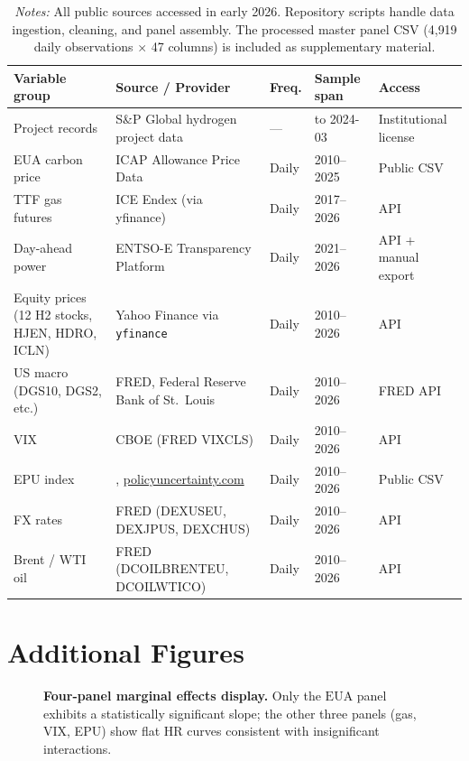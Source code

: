 \documentclass[11pt,a4paper]{article}
\newcommand{\HR}{\mathrm{HR}}
\newcommand{\EUA}{\mathrm{EUA}}
\begin{document}
\begin{table}[H]
\centering
\caption{Data sources and access methods.}
\label{tab:datasources}
\small
\begin{tabular}{p{3.4cm}p{3.2cm}p{1.4cm}p{1.8cm}p{3.0cm}}
\toprule
\textbf{Variable group} & \textbf{Source / Provider} & \textbf{Freq.} & \textbf{Sample span} & \textbf{Access} \\
\midrule
Project records & S\&P Global hydrogen project data \citep{SPGlobal2024} & --- & to 2024-03 & Institutional license \\
EUA carbon price & ICAP Allowance Price Data & Daily & 2010--2025 & Public CSV \\
TTF gas futures & ICE Endex (via yfinance) & Daily & 2017--2026 & API \\
Day-ahead power & ENTSO-E Transparency Platform & Daily & 2021--2026 & API + manual export \\
Equity prices (12 H2 stocks, HJEN, HDRO, ICLN) & Yahoo Finance via \texttt{yfinance} & Daily & 2010--2026 & API \\
US macro (DGS10, DGS2, etc.) & FRED, Federal Reserve Bank of St.\ Louis & Daily & 2010--2026 & FRED API \\
VIX & CBOE (FRED VIXCLS) & Daily & 2010--2026 & API \\
EPU index & \citet{BakerBloomDavis2016}, \url{policyuncertainty.com} & Daily & 2010--2026 & Public CSV \\
FX rates & FRED (DEXUSEU, DEXJPUS, DEXCHUS) & Daily & 2010--2026 & API \\
Brent / WTI oil & FRED (DCOILBRENTEU, DCOILWTICO) & Daily & 2010--2026 & API \\
\bottomrule
\end{tabular}
\caption*{\footnotesize \textit{Notes:} All public sources accessed in early 2026. Repository scripts handle data ingestion, cleaning, and panel assembly. The processed master panel CSV (4{,}919 daily observations $\times$ 47 columns) is included as supplementary material.}
\end{table}

\section{Additional Figures}

\begin{figure}[H]
\centering
{}
\caption{\textbf{Four-panel marginal effects display.} Only the $\EUA$ panel exhibits a statistically significant slope; the other three panels (gas, VIX, EPU) show flat $\HR$ curves consistent with insignificant interactions.}
\label{fig:4panel}
\end{figure}
\end{document}
